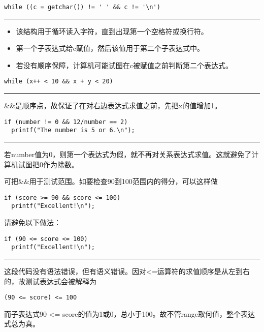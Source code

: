 \begin{frame}[fragile]
\begin{lstlisting}
while ((c = getchar()) != ' ' && c != '\n') 
\end{lstlisting} 

\rule{\textwidth}{.5mm} \pause \vspace{0.5mm}
\begin{itemize}
\item
该结构用于循环读入字符，直到出现第一个空格符或换行符。
\item 
第一个子表达式给c赋值，然后该值用于第二个子表达式中。
\item
若没有顺序保障，计算机可能试图在c被赋值之前判断第二个表达式。
\end{itemize}
\end{frame}



\begin{frame}[fragile]
\begin{lstlisting}
while (x++ < 10 && x + y < 20) 
\end{lstlisting} 

\rule{\textwidth}{.5mm} \pause \vspace{0.5mm}

\&\&是顺序点，故保证了在对右边表达式求值之前，先把x的值增加1。
\end{frame}


\begin{frame}[fragile]
\begin{lstlisting}
if (number != 0 && 12/number == 2)
  printf("The number is 5 or 6.\n");
\end{lstlisting} 

\rule{\textwidth}{.5mm} \pause \vspace{0.5mm}

若number值为0，则第一个表达式为假，就不再对关系表达式求值。这就避免了计算机试图把0作为除数。
\end{frame}

\begin{frame}[fragile]
可把\&\&用于测试范围。如要检查90到100范围内的得分，可以这样做
\begin{lstlisting}
if (score >= 90 && score <= 100)
  printf("Excellent!\n");
\end{lstlisting} \pause \vspace{0.1in}
\end{frame}

\begin{frame}[fragile]
请避免以下做法：
\begin{lstlisting}
if (90 <= score <= 100)
  printf("Excellent!\n");
\end{lstlisting}

\rule{\textwidth}{.5mm} \pause \vspace{0.5mm}

这段代码没有语法错误，但有语义错误。因对<=运算符的求值顺序是从左到右的，故测试表达式会被解释为
\begin{lstlisting}
(90 <= score) <= 100
\end{lstlisting}
而子表达式90 <= score的值为1或0，总小于100。故不管range取何值，整个表达式总为真。
\end{frame}

